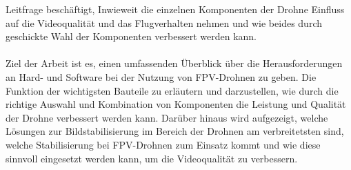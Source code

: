     Leitfrage beschäftigt, Inwieweit die einzelnen Komponenten der Drohne Einfluss auf die Videoqualität
    und das Flugverhalten nehmen und wie beides durch geschickte Wahl der Komponenten verbessert werden kann.\\
    \\
    Ziel der Arbeit ist es, einen umfassenden Überblick über die Herausforderungen an Hard- und Software bei
    der Nutzung von FPV-Drohnen zu geben. Die Funktion der wichtigsten Bauteile zu erläutern und darzustellen,
    wie durch die richtige Auswahl und Kombination von Komponenten die Leistung und Qualität der Drohne verbessert
    werden kann. Darüber hinaus wird aufgezeigt, welche Lösungen zur Bildstabilisierung im Bereich der Drohnen am
    verbreitetsten sind, welche Stabilisierung bei FPV-Drohnen zum Einsatz kommt und wie diese sinnvoll eingesetzt
    werden kann, um die Videoqualität zu verbessern.